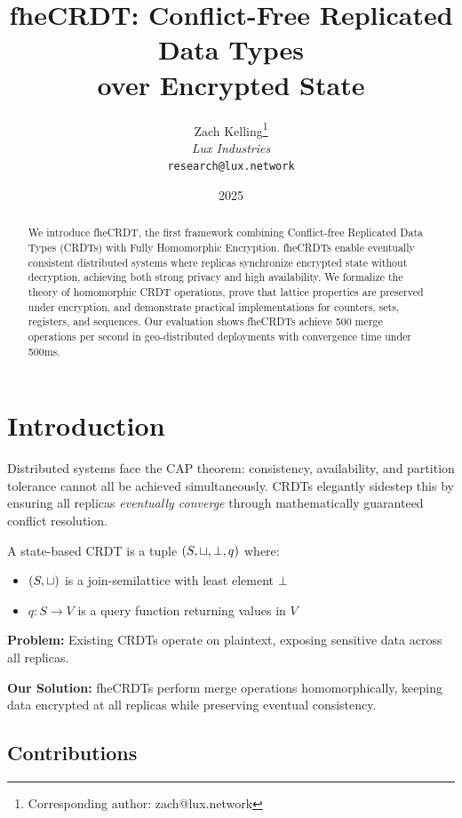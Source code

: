 \documentclass{../shared/luxfhe}
\title{\textbf{fheCRDT: Conflict-Free Replicated Data Types\\over Encrypted State}}
\author{
Zach Kelling\thanks{Corresponding author: zach@lux.network}\\
\textit{Lux Industries}\\
\texttt{research@lux.network}
}
\date{2025}
\begin{document}
\maketitle
\luxcoverpage

\begin{abstract}
We introduce fheCRDT, the first framework combining Conflict-free Replicated Data Types (CRDTs) with Fully Homomorphic Encryption. fheCRDTs enable eventually consistent distributed systems where replicas synchronize encrypted state without decryption, achieving both strong privacy and high availability. We formalize the theory of homomorphic CRDT operations, prove that lattice properties are preserved under encryption, and demonstrate practical implementations for counters, sets, registers, and sequences. Our evaluation shows fheCRDTs achieve 500 merge operations per second in geo-distributed deployments with convergence time under 500ms.
\end{abstract}

\section{Introduction}

Distributed systems face the CAP theorem: consistency, availability, and partition tolerance cannot all be achieved simultaneously. CRDTs elegantly sidestep this by ensuring all replicas \emph{eventually converge} through mathematically guaranteed conflict resolution.

\begin{definition}
A state-based CRDT is a tuple $(S, \sqcup, \bot, q)$ where:
\begin{itemize}[noitemsep]
    \item $(S, \sqcup)$ is a join-semilattice with least element $\bot$
    \item $q: S \to V$ is a query function returning values in $V$
\end{itemize}
\end{definition}

\textbf{Problem:} Existing CRDTs operate on plaintext, exposing sensitive data across all replicas.

\textbf{Our Solution:} fheCRDTs perform merge operations homomorphically, keeping data encrypted at all replicas while preserving eventual consistency.

\subsection{Contributions}
\end{document}
